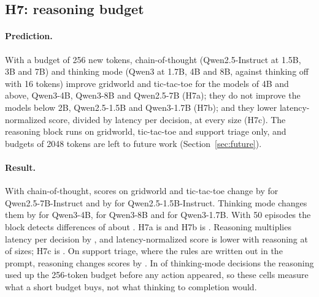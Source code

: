 \subsection{H7: reasoning budget}
\label{sec:res:h7}

\paragraph{Prediction.} With a budget of 256 new tokens, chain-of-thought (Qwen2.5-Instruct at 1.5B, 3B and 7B) and thinking mode (Qwen3 at 1.7B, 4B and 8B, against thinking off with 16 tokens) improve gridworld and tic-tac-toe for the models of 4B and above, Qwen3-4B, Qwen3-8B and Qwen2.5-7B (H7a); they do not improve the models below 2B, Qwen2.5-1.5B and Qwen3-1.7B (H7b); and they lower latency-normalized score, \norm{} divided by latency per decision, at every size (H7c). The reasoning block runs on gridworld, tic-tac-toe and support triage only, and budgets of 2048 tokens are left to future work (Section~\ref{sec:future}).

\paragraph{Result.} With chain-of-thought, scores on gridworld and tic-tac-toe change by  for Qwen2.5-7B-Instruct and by  for Qwen2.5-1.5B-Instruct. Thinking mode changes them by  for Qwen3-4B,  for Qwen3-8B and  for Qwen3-1.7B. With 50 episodes the block detects differences of about . H7a is  and H7b is . Reasoning multiplies latency per decision by \result{[factor]}, and latency-normalized score is lower with reasoning at \result{[number]} of \result{[number]} sizes; H7c is . On support triage, where the rules are written out in the prompt, reasoning changes scores by . In \result{[fraction]} of thinking-mode decisions the reasoning used up the 256-token budget before any action appeared, so these cells measure what a short budget buys, not what thinking to completion would. 

